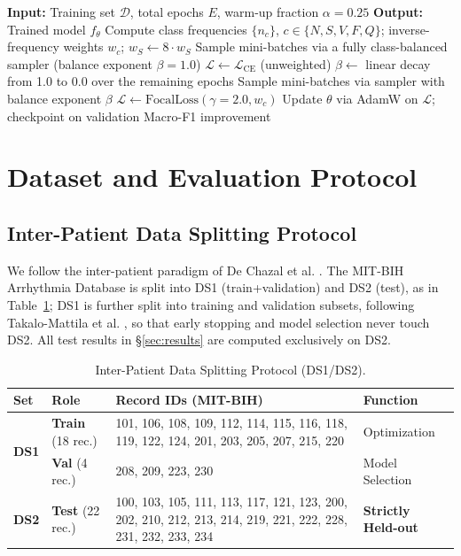 \documentclass[journal,twoside,web]{ieeecolor}
\begin{document}
\begin{algorithm}[!t]
\caption{Progressive Curriculum Anchoring (PCA)}
\label{alg:curriculum}
\begin{algorithmic}[1]
\STATE \textbf{Input:} Training set $\mathcal{D}$, total epochs $E$, warm-up fraction $\alpha=0.25$
\STATE \textbf{Output:} Trained model $f_\theta$
\STATE Compute class frequencies $\{n_c\}$, $c \in \{N,S,V,F,Q\}$; inverse-frequency weights $w_c$; $w_S \gets 8\cdot w_S$
\STATE Sample mini-batches via a fully class-balanced sampler (balance exponent $\beta=1.0$)
\STATE $\mathcal{L} \gets \mathcal{L}_{\text{CE}}$ (unweighted)
\ELSE
\STATE $\beta \gets$ linear decay from 1.0 to 0.0 over the remaining epochs
\STATE Sample mini-batches via sampler with balance exponent $\beta$
\STATE $\mathcal{L} \gets \text{FocalLoss}(\gamma=2.0, w_c)$
\ENDIF
\STATE Update $\theta$ via AdamW on $\mathcal{L}$; checkpoint on validation Macro-F1 improvement
\ENDFOR
\end{algorithmic}
\end{algorithm}

\section{Dataset and Evaluation Protocol}

\subsection{Inter-Patient Data Splitting Protocol}
We follow the inter-patient paradigm of De Chazal et al. \cite{chazal_automatic_2004}. The MIT-BIH Arrhythmia Database is split into DS1 (train+validation) and DS2 (test), as in Table~\ref{tab:split_protocol}; DS1 is further split into training and validation subsets, following Takalo-Mattila et al. \cite{takalo-mattila_inter-patient_2018}, so that early stopping and model selection never touch DS2. All test results in \S\ref{sec:results} are computed exclusively on DS2.

\begin{table}[!t]
\caption{Inter-Patient Data Splitting Protocol (DS1/DS2).}
\label{tab:split_protocol}
\centering
\footnotesize
\begin{tabular}{@{}l l p{6.5cm} l@{}}
\toprule
\textbf{Set} & \textbf{Role} & \textbf{Record IDs (MIT-BIH)} & \textbf{Function} \\ \midrule
\multirow{2}{*}{\textbf{DS1}} & \textbf{Train} (18 rec.) & 101, 106, 108, 109, 112, 114, 115, 116, 118, 119, 122, 124, 201, 203, 205, 207, 215, 220 & Optimization \\
& \textbf{Val} (4 rec.) & 208, 209, 223, 230 & Model Selection \\ \midrule
\textbf{DS2} & \textbf{Test} (22 rec.) & 100, 103, 105, 111, 113, 117, 121, 123, 200, 202, 210, 212, 213, 214, 219, 221, 222, 228, 231, 232, 233, 234 & \textbf{Strictly Held-out} \\ \bottomrule
\end{tabular}
\end{table}
\end{document}

